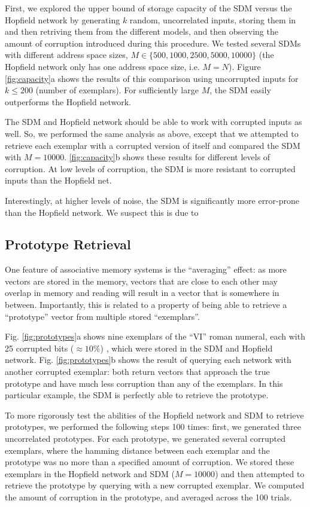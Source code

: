 \documentclass[10pt,letterpaper]{article}
\begin{document}
First, we explored the upper bound of storage capacity of the SDM
versus the Hopfield network by generating $k$ random, uncorrelated
inputs, storing them in and then retriving them from the different
models, and then observing the amount of corruption introduced during
this procedure. We tested several SDMs with different address space
sizes, $M\in\{500, 1000, 2500, 5000, 10000\}$ (the Hopfield network
only has one address space size, i.e. $M=N$).  Figure
\ref{fig:capacity}a shows the results of this comparison using
uncorrupted inputs for $k\leq 200$ (number of exemplars). For
sufficiently large $M$, the SDM easily outperforms the Hopfield
network.

The SDM and Hopfield network should be able to work with corrupted
inputs as well. So, we performed the same analysis as above, except
that we attempted to retrieve each exemplar with a corrupted version
of itself and compared the SDM with $M=10000$.  \ref{fig:capacity}b
shows these results for different levels of corruption. At low levels
of corruption, the SDM is more resistant to corrupted inputs than the
Hopfield net. 

Interestingly, at higher levels of noise, the SDM is significantly
more error-prone than the Hopfield network. We suspect this is due to


\subsection{Prototype Retrieval}

One feature of associative memory systems is the ``averaging'' effect:
as more vectors are stored in the memory, vectors that are close to
each other may overlap in memory and reading will result in a vector
that is somewhere in between. Importantly, this is related to a
property of being able to retrieve a ``prototype'' vector from
multiple stored ``exemplars''.

Fig. \ref{fig:prototypes}a shows nine exemplars of the ``VI'' roman
numeral, each with 25 corrupted bits ($\approx10\%$) , which were
stored in the SDM and Hopfield network. Fig. \ref{fig:prototypes}b
shows the result of querying each network with another corrupted
exemplar: both return vectors that approach the true prototype and
have much less corruption than any of the exemplars. In this
particular example, the SDM is perfectly able to retrieve the
prototype.

To more rigorously test the abilities of the Hopfield network and SDM
to retrieve prototypes, we performed the following steps 100 times:
first, we generated three uncorrelated prototypes. For each prototype,
we generated several corrupted exemplars, where the hamming distance
between each exemplar and the prototype was no more than a specified
amount of corruption. We stored these exemplars in the Hopfield
network and SDM ($M=10000$) and then attempted to retrieve the
prototype by querying with a new corrupted exemplar. We computed the
amount of corruption in the prototype, and averaged across the 100
trials. 
\end{document}
